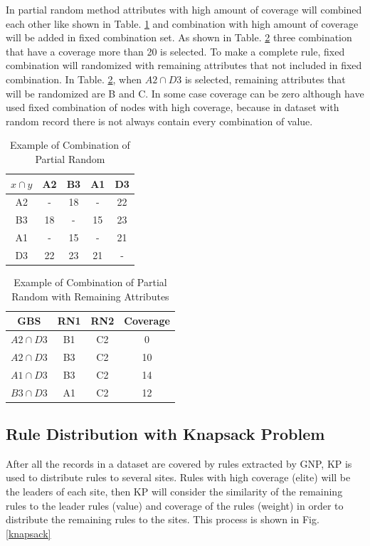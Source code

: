 \documentclass[fleqn,10pt,twocolumn]{SICE14}
\begin{document}
In partial random method attributes with high amount of coverage will combined each other like shown in Table. \ref{partial-random-combination-example} and combination with high amount of coverage will be added in fixed combination set. As shown in Table. \ref{partial-random-combination-example2} three combination that have a coverage more than 20 is selected. To make a complete rule, fixed combination will randomized with remaining attributes that not included in fixed combination. In Table. \ref{partial-random-combination-example2}, when $A2\cap D3$ is selected, remaining attributes that will be randomized are B and C. In some case coverage can be zero although have used fixed combination of nodes with high coverage, because in dataset with random record there is not always contain every combination of value.

\begin{table}[tb]
\caption{\label{partial-random-combination-example}Example of Combination of Partial Random}
\begin{center}
\begin{tabular}{|c|c|c|c|c|}
\hline 
$x\cap y$ & A2 & B3 & A1 & D3\tabularnewline
\hline 
A2 & - & 18 & - & 22\tabularnewline
\hline 
B3 & 18 & - & 15 & 23\tabularnewline
\hline 
A1 & - & 15 & - & 21\tabularnewline
\hline 
D3 & 22 & 23 & 21 & -\tabularnewline
\hline 
\end{tabular}
\end{center}
\end{table}

\begin{table}[tb]
\caption{\label{partial-random-combination-example2}Example of Combination of Partial Random with Remaining Attributes}
\begin{center}
\begin{tabular}{|c|c|c|c|}
\hline 
GBS & RN1 & RN2 & Coverage\tabularnewline
\hline 
$A2\cap D3$ & B1 & C2 & 0\tabularnewline
\hline 
$A2\cap D3$ & B3 & C2 & 10\tabularnewline
\hline 
$A1\cap D3$ & B3 & C2 & 14\tabularnewline
\hline 
$B3\cap D3$ & A1 & C2 & 12\tabularnewline
\hline 
\end{tabular}
\end{center}
\end{table}

\subsection{Rule Distribution with Knapsack Problem}
After all the records in a dataset are covered by rules extracted by GNP, KP is used to distribute rules to several sites. Rules with high coverage (elite) will be the leaders of each site, then KP will consider the similarity of the remaining rules to the leader rules (value) and coverage of the rules (weight) in order to distribute the remaining rules to the sites. This process is shown in Fig. \ref{knapsack}
\end{document}
